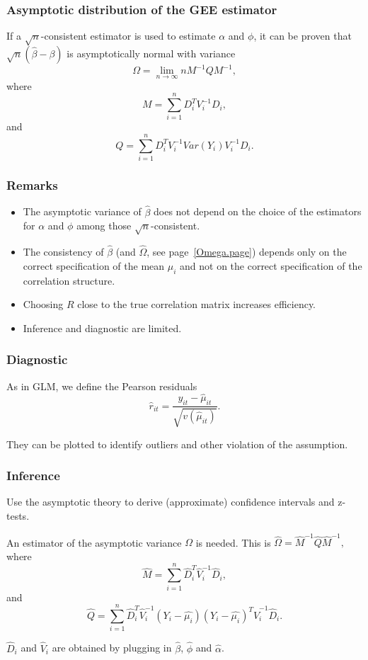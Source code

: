\documentclass{beamer}
\newcommand{\bs}{\bigskip}
\newcommand{\sms}{\smallskip}
\begin{document}
\begin{frame}
\frametitle{Asymptotic distribution of the GEE estimator}
If a $\sqrt{n}$-consistent estimator is used to estimate $\alpha$ and
$\phi$, it
can be proven that $\sqrt{n} (\hat{\beta} - \beta)$ is asymptotically
normal with variance
$$ \Omega = \lim_{n \rightarrow \infty} n M^{-1} Q M^{-1},$$
where
$$M = \sum_{i=1}^n D_i^T V_i^{-1} D_i,$$
and
$$Q = \sum_{i=1}^n D_i^T V_i^{-1} Var(Y_i) V_i^{-1} D_i.$$
\end{frame}

\begin{frame}
\frametitle{Remarks}
\begin{itemize}
\item The asymptotic variance of $\hat{\beta}$ does not depend on the
  choice of the estimators for $\alpha$ and $\phi$ among those
  $\sqrt{n}$-consistent.
\item The consistency of $\hat{\beta}$ (and $\hat{\Omega}$, see page~\ref{Omega.page}) depends
only on the correct 
specification of the mean $\mu_i$ and not on the correct specification
of the correlation structure.
\item Choosing $R$ close to the true correlation matrix increases
  efficiency.
\item Inference and diagnostic are limited.
\end{itemize}
\end{frame}

\begin{frame}
\frametitle{Diagnostic}

As in GLM, we define the Pearson residuals
$$\hat{r}_{it} = \frac{y_{it} - \hat{\mu}_{it}}{\sqrt{v(\hat{\mu}_{it})}}.$$

\bs
They can be plotted to identify outliers and other violation of the assumption.

\end{frame}

\begin{frame}
\frametitle{Inference}
Use the asymptotic theory to derive (approximate) confidence
intervals and z-tests. 

\label{Omega.page}
\bs
An estimator of the asymptotic variance $\Omega$ is needed. This is
$\hat{\Omega} = \hat{M}^{-1} \hat{Q} \hat{M}^{-1},$
where
$$\hat{M} = \sum_{i=1}^n \hat{D}_i^T \hat{V}_i^{-1} \hat{D}_i,$$
and
$$\hat{Q} = \sum_{i=1}^n \hat{D}_i^T \hat{V}_i^{-1} (Y_i - \hat{\mu_i}) (Y_i -
\hat{\mu_i})^T \hat{V}_i^{-1} \hat{D}_i.$$

\sms
$\hat{D}_i$ and $\hat{V}_i$ are obtained by plugging in $\hat{\beta}$,
$\hat{\phi}$ and $\hat{\alpha}$.
\end{frame}
\end{document}
